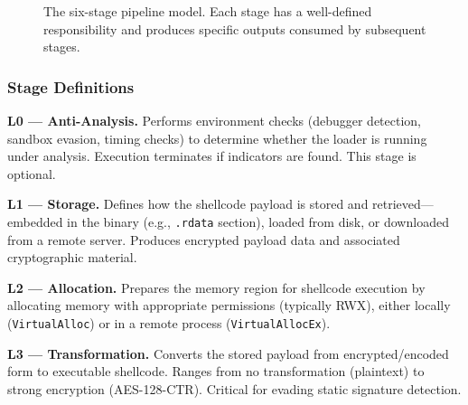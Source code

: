 \documentclass[10pt,a4paper,twocolumn]{article}
\begin{document}
\begin{figure}[htbp]
    \centering
    \setlength{\fboxsep}{8pt}
    \caption{The six-stage pipeline model. Each stage has a well-defined responsibility and produces specific outputs consumed by subsequent stages.}
    \label{fig:pipeline}
\end{figure}

\subsubsection{Stage Definitions}

\textbf{L0 --- Anti-Analysis.}
Performs environment checks (debugger detection, sandbox evasion, timing checks) to determine whether the loader is running under analysis.
Execution terminates if indicators are found.
This stage is optional.

\textbf{L1 --- Storage.}
Defines how the shellcode payload is stored and retrieved---embedded in the binary (e.g., \texttt{.rdata} section), loaded from disk, or downloaded from a remote server.
Produces encrypted payload data and associated cryptographic material.

\textbf{L2 --- Allocation.}
Prepares the memory region for shellcode execution by allocating memory with appropriate permissions (typically RWX), either locally (\texttt{VirtualAlloc}) or in a remote process (\texttt{VirtualAllocEx}).

\textbf{L3 --- Transformation.}
Converts the stored payload from encrypted/encoded form to executable shellcode.
Ranges from no transformation (plaintext) to strong encryption (AES-128-CTR).
Critical for evading static signature detection.
\end{document}
